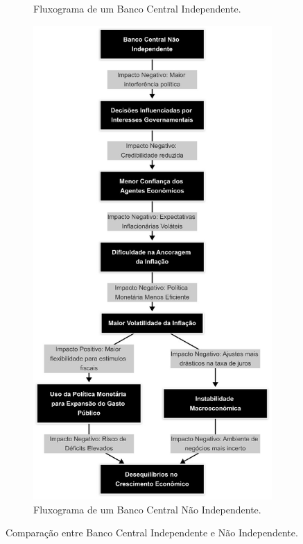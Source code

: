 \documentclass[a4paper,12pt]{article}[abnt2]
\begin{document}
\begin{figure}[H]
\begin{subfigure}[b]{0.45\textwidth}
        \caption{Fluxograma de um Banco Central Independente.}
        \label{fig:bc_independente}
    \end{subfigure}
    \hfill
    \begin{subfigure}[b]{0.45\textwidth}
        \centering
        \includegraphics[width=\linewidth]{Imagens/m2i2.jpg}
        \caption{Fluxograma de um Banco Central Não Independente.}
        \label{fig:bc_nao_independente}
    \end{subfigure}
    \caption{Comparação entre Banco Central Independente e Não Independente.}
    \label{fig:comparacao_bc}
\end{figure}
\end{document}
